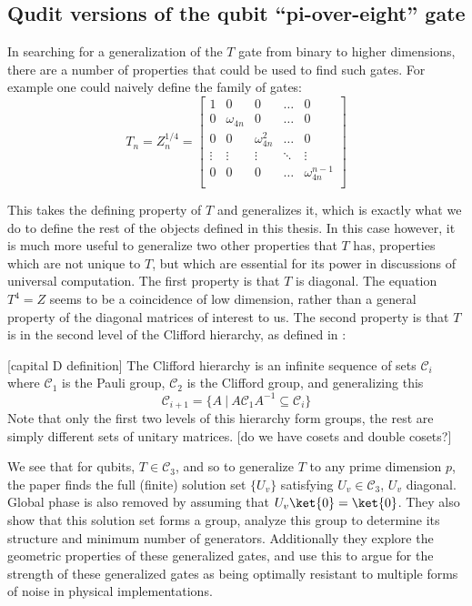 \subsection{Qudit versions of the qubit ``pi-over-eight'' gate}
In searching for a generalization of the $T$ gate from binary to higher dimensions, there are a number of properties that could be used to find such gates. For example one could naively define the family of gates:
\[T_n = Z_n^{1/4} = \left[\begin{matrix}
1 & 0 & 0 & \dots & 0 \\
0 & \omega_{4n} & 0 & \dots & 0 \\
0 & 0 & \omega_{4n}^2 & \dots & 0 \\
\vdots & \vdots & \vdots & \ddots & \vdots \\
0 & 0 & 0 & \dots & \omega_{4n}^{n-1} \\
\end{matrix}\right]\]

This takes the defining property of $T$ and generalizes it, which is exactly what we do to define the rest of the objects defined in this thesis. In this case however, it is much more useful to generalize two other properties that $T$ has, properties which are not unique to $T$, but which are essential for its power in discussions of universal computation. The first property is that $T$ is diagonal. The equation $T^4 = Z$ seems to be a coincidence of low dimension, rather than a general property of the diagonal matrices of interest to us. The second property is that $T$ is in the second level of the Clifford hierarchy, as defined in \cite{clifford-hierarchy}:

[capital D definition] The Clifford hierarchy is an infinite sequence of sets $\mathcal{C}_i$ where $\mathcal{C}_1$ is the Pauli group, $\mathcal{C}_2$ is the Clifford group, and generalizing this
\[\mathcal{C}_{i+1} = \{A\ |\ A\mathcal{C}_1A^{-1} \subseteq \mathcal{C}_i\}\]
Note that only the first two levels of this hierarchy form groups, the rest are simply different sets of unitary matrices.
[do we have cosets and double cosets?]

We see that for qubits, $T \in \mathcal{C}_3$, and so to generalize $T$ to any prime dimension $p$, the paper \cite{pi-over-eight} finds the full (finite) solution set $\{U_v\}$ satisfying $U_v \in \mathcal{C}_3$, $U_v$ diagonal. Global phase is also removed by assuming that $U_v\ket{0} = \ket{0}$. They also show that this solution set forms a group, analyze this group to determine its structure and minimum number of generators. Additionally they explore the geometric properties of these generalized gates, and use this to argue for the strength of these generalized gates as being optimally resistant to multiple forms of noise in physical implementations.


